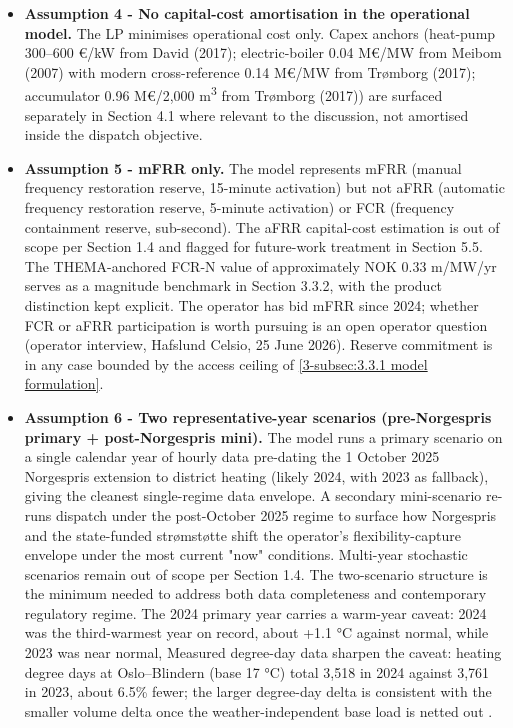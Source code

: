\begin{itemize}
    \item \textbf{Assumption 4 - No capital-cost amortisation in the operational model.} The LP minimises operational cost only. Capex anchors (heat-pump 300–600 €/kW from David (2017); electric-boiler  0.04 M€/MW from Meibom (2007) with modern cross-reference  0.14 M€/MW from Trømborg (2017); accumulator 0.96 M€/2,000 m\textsuperscript{3} from Trømborg (2017)) are surfaced separately in Section 4.1 where relevant to the discussion, not amortised inside the dispatch objective.

    \item \textbf{Assumption 5 - mFRR only.} The model represents mFRR (manual frequency restoration reserve, 15-minute activation) but not aFRR (automatic frequency restoration reserve, 5-minute activation) or FCR (frequency containment reserve, sub-second). The aFRR capital-cost estimation is out of scope per Section 1.4 and flagged for future-work treatment in Section 5.5. The THEMA-anchored FCR-N value of approximately NOK 0.33 m/MW/yr serves as a magnitude benchmark in Section 3.3.2, with the product distinction kept explicit. The operator has bid mFRR since 2024; whether FCR or aFRR participation is worth pursuing is an open operator question (operator interview, Hafslund Celsio, 25 June 2026). Reserve commitment is in any case bounded by the access ceiling of \autoref{3-subsec:3.3.1 model formulation}.

    \item \textbf{Assumption 6 - Two representative-year scenarios (pre-Norgespris primary + post-Norgespris mini).} The model runs a primary scenario on a single calendar year of hourly data pre-dating the 1 October 2025 Norgespris extension to district heating (likely 2024, with 2023 as fallback), giving the cleanest single-regime data envelope. A secondary mini-scenario re-runs dispatch under the post-October 2025 regime to surface how Norgespris and the state-funded strømstøtte shift the operator's flexibility-capture envelope under the most current "now" conditions. Multi-year stochastic scenarios remain out of scope per Section 1.4. The two-scenario structure is the minimum needed to address both data completeness and contemporary regulatory regime. The 2024 primary year carries a warm-year caveat: 2024 was the third-warmest year on record, about +1.1 °C against normal, while 2023 was near normal, Measured degree-day data sharpen the caveat: heating degree days at Oslo–Blindern (base 17 °C) total 3,518 in 2024 against 3,761 in 2023, about 6.5\% fewer; the larger degree-day delta is consistent with the smaller volume delta once the weather-independent base load is netted out \cite{norsk_klima_service_senter_observasjoner_nodate}.


\end{itemize}
